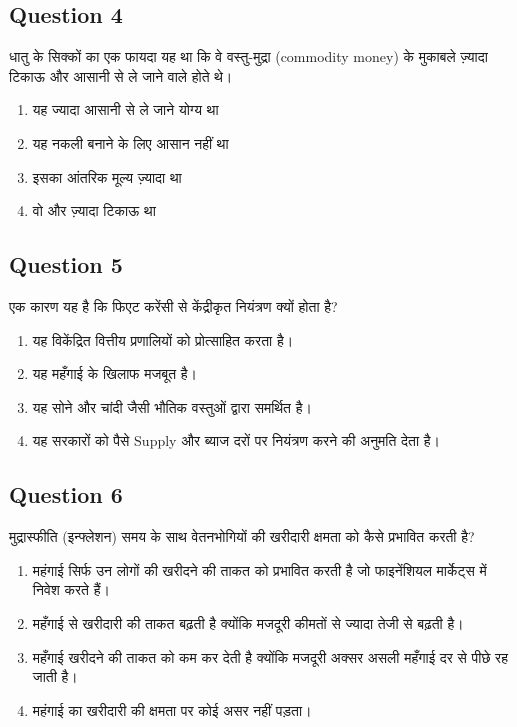 \documentclass[12pt,a4paper]{article}
\begin{document}
\bigskip


\subsection*{Question 4}
धातु के सिक्कों का एक फायदा यह था कि वे वस्तु-मुद्रा (commodity money) के मुकाबले ज़्यादा टिकाऊ और आसानी से ले जाने वाले होते थे।

\begin{enumerate}[label=\Alph*., leftmargin=*]
\item यह ज्यादा आसानी से ले जाने योग्य था
\item यह नकली बनाने के लिए आसान नहीं था
\item इसका आंतरिक मूल्य ज़्यादा था
\item वो और ज़्यादा टिकाऊ था
\end{enumerate}

\bigskip


\subsection*{Question 5}
एक कारण यह है कि फिएट करेंसी से केंद्रीकृत नियंत्रण क्यों होता है?

\begin{enumerate}[label=\Alph*., leftmargin=*]
\item यह विकेंद्रित वित्तीय प्रणालियों को प्रोत्साहित करता है।
\item यह महँगाई के खिलाफ मजबूत है।
\item यह सोने और चांदी जैसी भौतिक वस्तुओं द्वारा समर्थित है।
\item यह सरकारों को पैसे Supply और ब्याज दरों पर नियंत्रण करने की अनुमति देता है।
\end{enumerate}

\bigskip


\subsection*{Question 6}
मुद्रास्फीति (इन्फ्लेशन) समय के साथ वेतनभोगियों की खरीदारी क्षमता को कैसे प्रभावित करती है?

\begin{enumerate}[label=\Alph*., leftmargin=*]
\item महंगाई सिर्फ उन लोगों की खरीदने की ताकत को प्रभावित करती है जो फाइनेंशियल मार्केट्स में निवेश करते हैं।
\item महँगाई से खरीदारी की ताकत बढ़ती है क्योंकि मजदूरी कीमतों से ज्यादा तेजी से बढ़ती है।
\item महँगाई खरीदने की ताकत को कम कर देती है क्योंकि मजदूरी अक्सर असली महँगाई दर से पीछे रह जाती है।
\item महंगाई का खरीदारी की क्षमता पर कोई असर नहीं पड़ता।
\end{enumerate}
\end{document}

